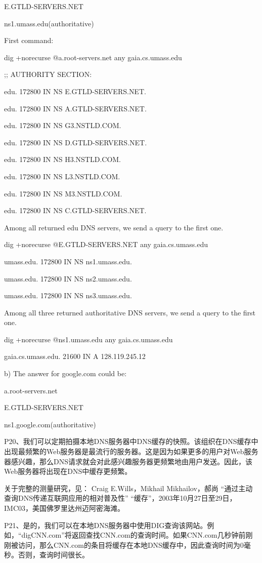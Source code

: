\documentclass[11pt,UTF8,twoside]{article}
\begin{document}
	E.GTLD-SERVERS.NET 
	
	ns1.umass.edu(authoritative) 
	
	First command: 
	
	dig +norecurse @a.root-servers.net any gaia.cs.umass.edu 
	
	;; AUTHORITY SECTION: 
	
	edu. 172800 IN NS E.GTLD-SERVERS.NET. 
	
	edu. 172800 IN NS A.GTLD-SERVERS.NET. 
	
	edu. 172800 IN NS G3.NSTLD.COM. 
	
	edu. 172800 IN NS D.GTLD-SERVERS.NET. 
	
	edu. 172800 IN NS H3.NSTLD.COM. 
	
	edu. 172800 IN NS L3.NSTLD.COM. 
	
	edu. 172800 IN NS M3.NSTLD.COM. 
	
	edu. 172800 IN NS C.GTLD-SERVERS.NET. 
	
	Among all returned edu DNS servers, we send a query to the first one. 
	
	dig +norecurse @E.GTLD-SERVERS.NET any gaia.cs.umass.edu 
	
	umass.edu. 172800 IN NS ns1.umass.edu.
	
	umass.edu. 172800 IN NS ns2.umass.edu. 
	
	umass.edu. 172800 IN NS ns3.umass.edu. 
	
	Among all three returned authoritative DNS servers, we send a query to the first one.
	
	dig +norecurse @ns1.umass.edu any gaia.cs.umass.edu 
	
	gaia.cs.umass.edu. 21600 IN A 128.119.245.12 
	
	b) The answer for google.com could be: 
	
	a.root-servers.net 
	
	E.GTLD-SERVERS.NET 
	
	ns1.google.com(authoritative) 
	
	P20、我们可以定期拍摄本地DNS服务器中DNS缓存的快照。该组织在DNS缓存中出现最频繁的Web服务器是最流行的服务器。这是因为如果更多的用户对Web服务器感兴趣，那么DNS请求就会对此感兴趣服务器更频繁地由用户发送。因此，该Web服务器将出现在DNS中缓存更频繁。
	
	关于完整的测量研究，见： Craig E.Wills，Mikhail Mikhailov，郝尚 “通过主动查询DNS传递互联网应用的相对普及性” “缓存”，2003年10月27日至29日，IMC03，美国佛罗里达州迈阿密海滩。
	
	P21、是的，我们可以在本地DNS服务器中使用DIG查询该网站。例如，“digCNN.com”将返回查找CNN.com的查询时间。如果CNN.com几秒钟前刚刚被访问，那么CNN.com的条目将缓存在本地DNS缓存中，因此查询时间为0毫秒。否则，查询时间很长。
	
\end{document}
